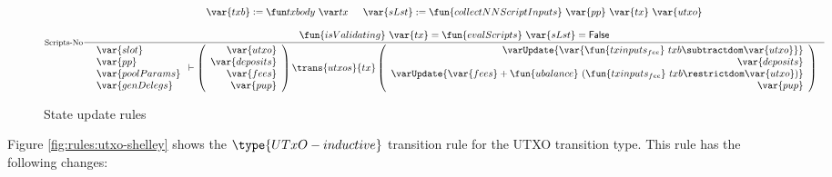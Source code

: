\begin{figure}[htb]
\begin{equation}
{    }
  \end{equation}
  \begin{equation}
    \inference[Scripts-No]
    {
    \var{txb}\leteq\txbody{tx} &
    \var{sLst} := \fun{collectNNScriptInputs}~\var{pp}~\var{tx}~\var{utxo}
    \\
    ~
    \\
    \fun{isValidating}~\var{tx} = \fun{evalScripts}~\var{sLst} = \False
    }
    {
    \begin{array}{l}
      \var{slot}\\
      \var{pp}\\
      \var{poolParams}\\
      \var{genDelegs}\\
    \end{array}
      \vdash
      \left(
      \begin{array}{r}
        \var{utxo} \\
        \var{deposits} \\
        \var{fees} \\
        \var{pup} \\
      \end{array}
      \right)
      \trans{utxos}{tx}
      \left(
      \begin{array}{r}
        \varUpdate{\var{\fun{txinputs_{fee}}~{txb} \subtractdom \var{utxo}}}  \\
        \var{deposits} \\
        \varUpdate{\var{fees} + \fun{ubalance}~(\fun{txinputs_{fee}}~{txb}\restrictdom \var{utxo})} \\
        \var{pup} \\
      \end{array}
      \right)
    }
  \end{equation}
  \caption{State update rules}
  \label{fig:rules:utxo-state-upd}
\end{figure}

Figure \ref{fig:rules:utxo-shelley} shows the $\type{UTxO-inductive}$
transition rule for the UTXO transition type.
This rule has the following changes:

